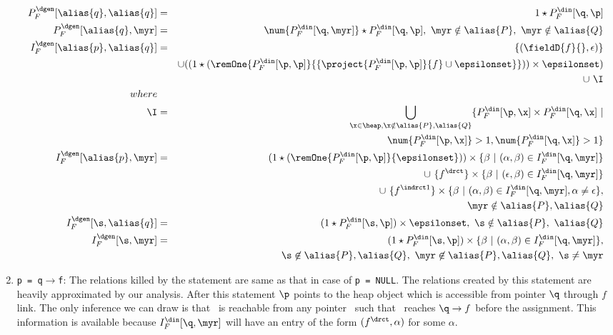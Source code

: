 \begin{enumerate}
{\begin{eqnarray*}
P_F^{\dgen}[\alias{q}, \alias{q}] &=& 1 \star P_F^{\din}[\q, \p] \\
P_F^{\dgen}[\alias{q}, \myr] &=& \num{P_F^{\din}[\q, \myr]} \star P_F^{\din}[\q, \p],\ \myr \notin \alias{P},\ \myr \notin \alias{Q} \\ 
I_F^{\dgen}[\alias{p}, \alias{q}] &=& \{(\fieldD{f}{}, \epsilon)\} \\
	  &&   \cup ((1 \star (\remOne{P_F^{\din}[\p, \p]}{ \{\project{P_F^{\din}[\p,\p]}{f} \cup \epsilonset \} })) \times \epsilonset) \\ 
	  && \cup\  \I \\
 	  \quad \quad where \\ 
 	  \I  &=&   \bigcup_{\x\in\heap,\x \notin \alias{P},\alias{Q} } \{ P_F^{\din}[\p,\x] \times P_F^{\din}[\q,\x] \ \vert \\
	  && \ \num{P_F^{\din}[\p,\x]} >1 , \num{P_F^{\din}[\q,\x]} >1 \} \\
I_F^{\dgen}[\alias{p}, \myr] &=& 
	  (1 \star (\remOne{P_F^{\din}[\p, \p]}{\epsilonset})) \times \{\beta\ \vert\ (\alpha, \beta) \in I_F^{\din}[\q, \myr] \}  \\ 
	  && \cup\ \{f^\drct\} \times \{\beta\ \vert\ (\epsilon, \beta) \in I_F^{\din}[\q, \myr] \} \\
	  && \cup\ \{f^{\indrct 1}\} \times \{\beta\ \vert\ (\alpha, \beta) \in I_F^{\din}[\q, \myr], \alpha \not= \epsilon \},  \\
	  &&  \myr \notin \alias{P}, \alias{Q} \\
 	  I_F^{\dgen}[\s, \alias{q}] &=& (1 \star P_F^{\din}[\s, \p]) \times 
 	  \epsilonset,\ \s \notin \alias{P},\ \alias{Q} \\
 	  I_F^{\dgen}[\s, \myr] &=& (1 \star P_F^{\din}[\s, \p])           %
 	  \times \{\beta\ \vert\ (\alpha, \beta) \in I_F^{\din}[\q,
  	    \myr]\}, \\
 	     && \qquad \s \not\in \alias{P},\alias{Q},\ \myr \not\in \alias{P},\alias{Q},\ \s \not= \myr \\
\end{eqnarray*}
}


\item {\tt p = q$\rightarrow$f}: 
The relations killed by the
  statement are same as that in case of {\tt p = NULL}. The
  relations created by this statement are heavily
  approximated by our analysis.  After this statement $\p$
  points to the heap object which is accessible from pointer
  $\q$ through $f$ link. The only inference we can draw is
  that \p\ is reachable from any pointer \myr\ such that
  \myr\ reaches $\q\rightarrow f$ before the assignment. This
  information is available because $I_F^{\din}[\q, \myr]$
  will have an entry of the form $(f^\drct, \alpha)$ for some
  $\alpha$. 


\end{enumerate}

